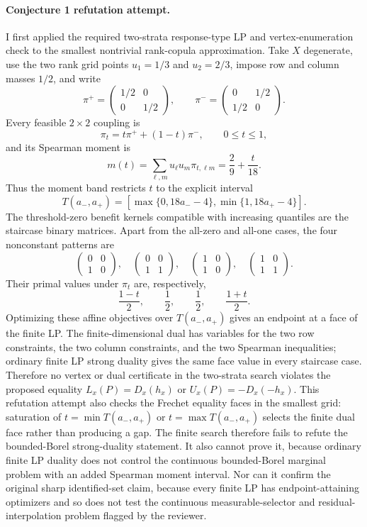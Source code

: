 \documentclass[11pt]{article}
\theoremstyle{definition}
\theoremstyle{plain}
\theoremstyle{remark}
\begin{document}
\paragraph{Conjecture 1 refutation attempt.}
I first applied the required two-strata response-type LP and vertex-enumeration check to the smallest nontrivial rank-copula approximation.  Take \(X\) degenerate, use the two rank grid points \(u_1=1/3\) and \(u_2=2/3\), impose row and column masses \(1/2\), and write
\[
\pi^+=\begin{pmatrix}1/2&0\\0&1/2\end{pmatrix},
\qquad
\pi^-=\begin{pmatrix}0&1/2\\1/2&0\end{pmatrix}.
\]
Every feasible \(2\times2\) coupling is
\[
\pi_t=t\pi^+ +(1-t)\pi^-,\qquad 0\le t\le1,
\]
and its Spearman moment is
\[
m(t)=\sum_{\ell,m}u_\ell u_m\pi_{t,\ell m}
=\frac{2}{9}+\frac{t}{18}.
\]
Thus the moment band restricts \(t\) to the explicit interval
\[
T(a_-,a_+)=
\left[\max\{0,18a_- -4\},\min\{1,18a_+ -4\}\right].
\]
The threshold-zero benefit kernels compatible with increasing quantiles are the staircase binary matrices.  Apart from the all-zero and all-one cases, the four nonconstant patterns are
\[
\begin{pmatrix}0&0\\1&0\end{pmatrix},\quad
\begin{pmatrix}0&0\\1&1\end{pmatrix},\quad
\begin{pmatrix}1&0\\1&0\end{pmatrix},\quad
\begin{pmatrix}1&0\\1&1\end{pmatrix}.
\]
Their primal values under \(\pi_t\) are, respectively,
\[
\frac{1-t}{2},\qquad
\frac{1}{2},\qquad
\frac{1}{2},\qquad
\frac{1+t}{2}.
\]
Optimizing these affine objectives over \(T(a_-,a_+)\) gives an endpoint at a face of the finite LP.  The finite-dimensional dual has variables for the two row constraints, the two column constraints, and the two Spearman inequalities; ordinary finite LP strong duality gives the same face value in every staircase case.  Therefore no vertex or dual certificate in the two-strata search violates the proposed equality \(L_x(P)=D_x(h_x)\) or \(U_x(P)=-D_x(-h_x)\).  This refutation attempt also checks the Frechet equality faces in the smallest grid: saturation of \(t=\min T(a_-,a_+)\) or \(t=\max T(a_-,a_+)\) selects the finite dual face rather than producing a gap.  The finite search therefore fails to refute the bounded-Borel strong-duality statement.  It also cannot prove it, because ordinary finite LP duality does not control the continuous bounded-Borel marginal problem with an added Spearman moment interval.  Nor can it confirm the original sharp identified-set claim, because every finite LP has endpoint-attaining optimizers and so does not test the continuous measurable-selector and residual-interpolation problem flagged by the reviewer.
\end{document}
